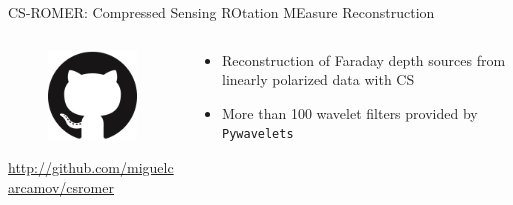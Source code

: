 \documentclass[xetex,aspectratio=169]{beamer}
\begin{document}
    \begin{frame}{CS-ROMER: Compressed Sensing ROtation MEasure Reconstruction}
        \begin{columns}[onlytextwidth,t]
        \begin{column}{.5\textwidth}
            \begin{figure}
                \centering
                \includegraphics[scale=0.5]{figures/logos/GitHub-Mark-120px-plus.png}
            \end{figure}
            
            \url{http://github.com/miguelcarcamov/csromer}
        \end{column}
    \begin{column}{.5\textwidth}
        \begin{itemize}
            \item Reconstruction of Faraday depth sources from linearly polarized data with CS
            \item More than 100 wavelet filters provided by {\tt Pywavelets}

        \end{itemize}
    \end{column}%
    
    \end{columns}
    \end{frame}
    
\end{document}
